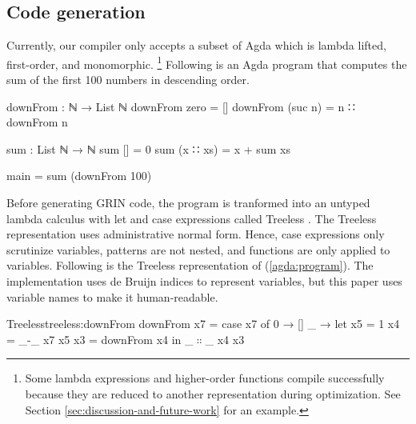 \documentclass[9pt, twocolumn]{article}
\newcommand{\refp}[1]{(\ref{#1})}
\begin{document}
\subsection{Code generation}
Currently, our compiler only accepts a subset of Agda which is lambda lifted, first-order, and monomorphic.%
\footnote{%
Some lambda expressions and higher-order functions compile successfully because they are reduced to another representation during optimization. 
See Section \ref{sec:discussion-and-future-work} for an example.
}
Following is an Agda program that computes the sum of the first 100 numbers in descending order. 
\begin{code}[number=agda:program]
downFrom : ℕ → List ℕ
downFrom zero = []
downFrom (suc n) = n ∷ downFrom n 

sum : List ℕ → ℕ
sum [] = 0
sum (x ∷ xs) = x + sum xs

main = sum (downFrom 100) 
\end{code}

Before generating GRIN code, the program is tranformed into an untyped lambda calculus with let and case expressions called Treeless \citep{hausmann2015}.
The Treeless representation uses administrative normal form. 
Hence, case expressions only scrutinize variables, patterns are not nested, and functions are only applied to variables.
Following is the Treeless representation of  \refp{agda:program}.
The implementation uses de Bruijn indices to represent variables, but this paper uses variable names to make it human-readable. 

\begin{typewriter}{Treeless}{treeless:downFrom}
downFrom x7 = case x7 of
  0 → []
  _ → let x5 = 1
          x4 = _-_ x7 x5
          x3 = downFrom x4 in 
      _$∷$_ x4 x3
\end{typewriter}

\end{document}

